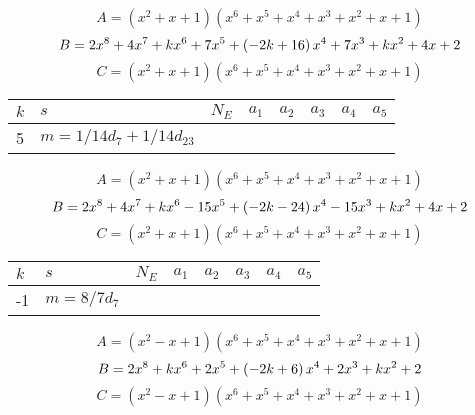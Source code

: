 \documentclass{amsart}
\begin{document}
$$A=(x^2
 + x
 + 1)(x^6
 + x^5
 + x^4
 + x^3
 + x^2
 + x
 + 1)$$
$$B=2\*x^8
 + 4\*x^7
 + k\*x^6
 + 7\*x^5
 + \left(-2\*k
 + 16\right) \*x^4
 + 7\*x^3
 + k\*x^2
 + 4\*x
 + 2$$
$$C=(x^2
 + x
 + 1)(x^6
 + x^5
 + x^4
 + x^3
 + x^2
 + x
 + 1)$$
\begin{longtable}{|l|l|l|lllll|}
\hline
$k$ & $s$ & $N_E$ & $a_1$ & $a_2$ & $a_3$ & $a_4$ & $a_5$\\
\hline
5&$m=1/14d_{7}+1/14d_{23}$&&\multicolumn{5}{c|}{}\\
\hline
\end{longtable}
$$A=(x^2
 + x
 + 1)(x^6
 + x^5
 + x^4
 + x^3
 + x^2
 + x
 + 1)$$
$$B=2\*x^8
 + 4\*x^7
 + k\*x^6
 - 15\*x^5
 + \left(-2\*k
 - 24\right) \*x^4
 - 15\*x^3
 + k\*x^2
 + 4\*x
 + 2$$
$$C=(x^2
 + x
 + 1)(x^6
 + x^5
 + x^4
 + x^3
 + x^2
 + x
 + 1)$$
\begin{longtable}{|l|l|l|lllll|}
\hline
$k$ & $s$ & $N_E$ & $a_1$ & $a_2$ & $a_3$ & $a_4$ & $a_5$\\
\hline
-1&$m=8/7d_{7}$&&\multicolumn{5}{c|}{}\\
\hline
\end{longtable}
$$A=(x^2
 - x
 + 1)(x^6
 + x^5
 + x^4
 + x^3
 + x^2
 + x
 + 1)$$
$$B=2\*x^8
 + k\*x^6
 + 2\*x^5
 + \left(-2\*k
 + 6\right) \*x^4
 + 2\*x^3
 + k\*x^2
 + 2$$
$$C=(x^2
 - x
 + 1)(x^6
 + x^5
 + x^4
 + x^3
 + x^2
 + x
 + 1)$$
\end{document}
